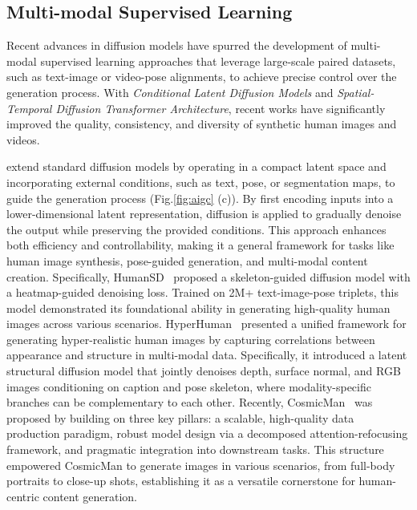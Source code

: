 \subsection{Multi-modal Supervised Learning}

Recent advances in diffusion models have spurred the development of multi-modal supervised learning approaches that leverage large-scale paired datasets, such as text-image or video-pose alignments, to achieve precise control over the generation process.
With \textit{Conditional Latent Diffusion Models} and \textit{Spatial-Temporal Diffusion Transformer Architecture}, recent works have significantly improved the quality, consistency, and diversity of synthetic human images and videos.


 extend standard diffusion models by operating in a compact latent space and incorporating external conditions, such as text, pose, or segmentation maps, to guide the generation process (Fig.\ref{fig:aigc} (c)). By first encoding inputs into a lower-dimensional latent representation, diffusion is applied to gradually denoise the output while preserving the provided conditions. This approach enhances both efficiency and controllability, making it a general framework for tasks like human image synthesis, pose-guided generation, and multi-modal content creation. Specifically,
HumanSD~\cite{ju2023humansd} proposed a skeleton-guided diffusion model with a heatmap-guided denoising loss. Trained on 2M+ text-image-pose triplets, this model demonstrated its foundational ability in generating high-quality human images across various scenarios.
HyperHuman~\cite{liu2023hyperhuman} presented a unified framework for generating hyper-realistic human images by capturing correlations between appearance and structure in multi-modal data. Specifically, it introduced a latent structural diffusion model that jointly denoises depth, surface normal, and RGB images conditioning on caption and pose skeleton, where modality-specific branches can be complementary to each other.
Recently, CosmicMan~\cite{li2024cosmicman} was proposed by building on three key pillars: a scalable, high-quality data production paradigm, robust model design via a decomposed attention-refocusing framework, and pragmatic integration into downstream tasks. This structure empowered CosmicMan to generate images in various scenarios, from full-body portraits to close-up shots, establishing it as a versatile cornerstone for human-centric content generation.


